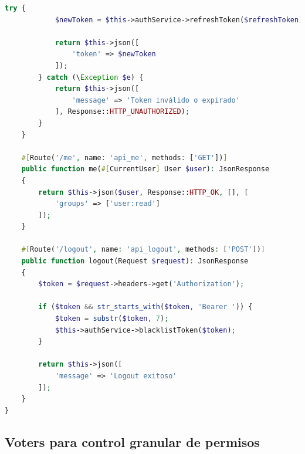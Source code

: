 \documentclass[12pt,a4paper,oneside]{report}
\begin{document}
\begin{lstlisting}[language=PHP]
        try {
            $newToken = $this->authService->refreshToken($refreshToken);
            
            return $this->json([
                'token' => $newToken
            ]);
        } catch (\Exception $e) {
            return $this->json([
                'message' => 'Token inválido o expirado'
            ], Response::HTTP_UNAUTHORIZED);
        }
    }

    #[Route('/me', name: 'api_me', methods: ['GET'])]
    public function me(#[CurrentUser] User $user): JsonResponse
    {
        return $this->json($user, Response::HTTP_OK, [], [
            'groups' => ['user:read']
        ]);
    }

    #[Route('/logout', name: 'api_logout', methods: ['POST'])]
    public function logout(Request $request): JsonResponse
    {
        $token = $request->headers->get('Authorization');
        
        if ($token && str_starts_with($token, 'Bearer ')) {
            $token = substr($token, 7);
            $this->authService->blacklistToken($token);
        }

        return $this->json([
            'message' => 'Logout exitoso'
        ]);
    }
}
\end{lstlisting}

\subsection{Voters para control granular de
permisos}\label{voters-para-control-granular-de-permisos}
\end{document}

